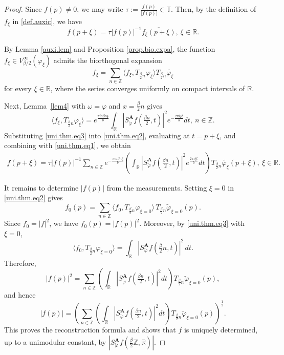 \documentclass[11pt, reqno]{amsart}
\newcommand{\Z}{\mathbb{Z}}
\newcommand{\R}{\mathbb{R}}
\newcommand{\T}{\mathbb{T}}
\numberwithin{equation}{section}
\begin{document}
\begin{proof}
	Since $f(p)\neq 0$, we may write $
	\tau:=\frac{f(p)}{|f(p)|}\in\T$. 
	Then, by the definition of $f_\xi$ in \eqref{def.auxic}, we have
	\begin{equation}\label{uni.thm.eq1}
		f(p+\xi)=\tau |f(p)|^{-1}\overline{f_\xi(p+\xi)}, \  \xi\in\R.
	\end{equation}

	By Lemma \ref{auxi.lem} and Proposition \ref{prop.bio.expa}, the function $f_\xi \in V_{\beta/2}^{\infty}(\varphi_\xi)$ admits the biorthogonal expansion
	\begin{equation}\label{uni.thm.eq2}
		f_\xi
		=
		\sum_{n\in \Z}
		\langle f_\xi , T_{\frac{\beta}{2} n} \varphi_\xi \rangle
		T_{\frac{\beta}{2} n} \widetilde{\varphi_\xi}
	\end{equation}
	 for every $\xi\in\R$, where the series converges uniformly on compact intervals of $\R$.

	Next, Lemma~\ref{lem4} with $\omega=\varphi$ and $x=\frac{\beta}{2}n$ gives
	\begin{equation}\label{uni.thm.eq3}
		\langle f_\xi , T_{\frac{\beta}{2} n} \varphi_\xi \rangle
		= e^{\frac{\pi ia\beta n\xi}{b}}
		\int_{\R} |S_{\check{\varphi}}^{\mathbf{A}} f(\tfrac{\beta  n}{2},t)|^2 e^{-\frac{2\pi i \xi t}{b}} dt, \  n\in\Z.
	\end{equation}
	Substituting \eqref{uni.thm.eq3} into \eqref{uni.thm.eq2}, evaluating at $t=p+\xi$, and combining with \eqref{uni.thm.eq1}, we obtain
	\begin{align*}
		f(p+\xi) = 	\tau |f(p)|^{-1}
		\sum_{n\in \Z}
		e^{-\frac{\pi ia\beta n\xi}{b}}
		\left(\int_{\R} |S_{\check{\varphi}}^{\mathbf{A}} f(\tfrac{\beta  n}{2},t)|^2 e^{\frac{2\pi i\xi t}{b}} dt \right)
		T_{\frac{\beta}{2}n} \widetilde{\varphi_\xi }(p+\xi), \  \xi\in \R.
	\end{align*}

	It remains to determine $|f(p)|$ from the measurements. Setting $\xi=0$ in \eqref{uni.thm.eq2} gives 
		 $$ f_0(p) =
		\sum_{n\in\Z}
		\langle f_0,T_{\frac{\beta}{2}n}\varphi_{\xi=0}\rangle\,
		T_{\frac{\beta}{2}n}\widetilde{\varphi}_{\xi=0}(p).$$
	Since $f_0=|f|^2$, we have $f_0(p)=|f(p)|^2$. Moreover, by \eqref{uni.thm.eq3} with $\xi=0$,
 $$ \langle f_0,T_{\frac{\beta}{2}n}\varphi_{\xi=0}\rangle = 	\int_{\R}|S_{\check{\varphi}}^{\mathbf{A}} f(\tfrac{\beta}{2}n,t)|^2\,dt.$$
	Therefore,
	$$ |f(p)|^2 = 	\sum_{n\in \Z}\left(\int_{\R} |S_{\check{\varphi}}^{\mathbf{A}} f(\tfrac{\beta  n}{2},t)|^2 dt \right)T_{\frac{\beta}{2}n} \widetilde{\varphi}_{\xi=0}(p),$$
	and hence
\begin{equation*}
		|f(p)| =\left(
		\sum_{n\in \Z}
		\left(\int_{\R} |S_{\check{\varphi}}^{\mathbf{A}} f(\tfrac{\beta  n}{2},t)|^2 dt \right)
		T_{\frac{\beta}{2}n} \widetilde{\varphi}_{\xi=0}(p)
		\right)^{\frac{1}{2}}.
\end{equation*}
	This proves the reconstruction formula and shows that $f$ is uniquely determined, up to a unimodular constant, by $
	|S_{\check{\varphi}}^{\mathbf{A}} f(\tfrac{\beta }{2} \Z,\R)|$.
	\qedhere
\end{proof}
\end{document}
